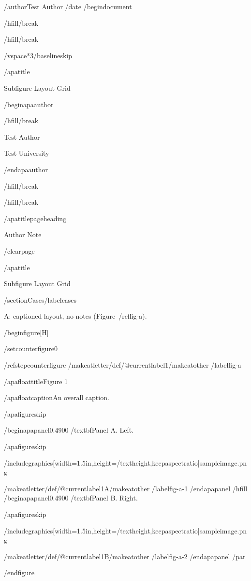 /author{Test Author}
/date{}
/begin{document}


/hfill/break

/hfill/break

/vspace*{3/baselineskip}

/apatitle{

Subfigure Layout Grid

}

/begin{apaauthor}

/hfill/break

Test Author

Test University

/end{apaauthor}

/hfill/break

/hfill/break

/apatitlepageheading{

Author Note

}

/clearpage

/apatitle{

Subfigure Layout Grid

}

/section{Cases}/label{cases}

A: captioned layout, no notes (Figure~/ref{fig-a}).

/begin{figure}[H]

/setcounter{figure}{0}

/refstepcounter{figure}%
/makeatletter/def/@currentlabel{1}/makeatother%
/label{fig-a}

/apafloattitle{Figure 1}

/apafloatcaption{An overall caption.}

/apafigureskip

/begin{apapanel}{0.4900}%
/textbf{Panel A}. Left.

/apafigureskip

/includegraphics[width=1.5in,height=/textheight,keepaspectratio]{sampleimage.png}

/makeatletter/def/@currentlabel{1A}/makeatother%
/label{fig-a-1}
/end{apapanel}%
/hfill
/begin{apapanel}{0.4900}%
/textbf{Panel B}. Right.

/apafigureskip

/includegraphics[width=1.5in,height=/textheight,keepaspectratio]{sampleimage.png}

/makeatletter/def/@currentlabel{1B}/makeatother%
/label{fig-a-2}
/end{apapanel}%
/par

/end{figure}

